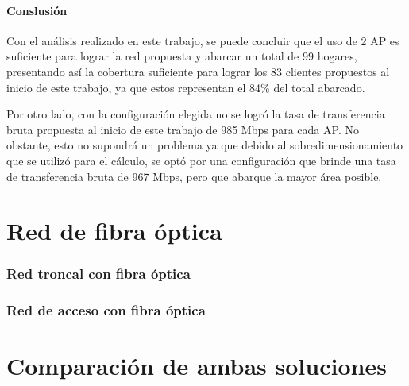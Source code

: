 \documentclass[11pt,a4paper]{article}
\begin{document}
\clearpage
\subsection{Conslusión}

Con el análisis realizado en este trabajo, se puede concluir que el uso de 2 AP es suficiente para lograr la red propuesta y abarcar un total de 99 hogares, presentando así la cobertura suficiente para lograr los 83 clientes propuestos al inicio de este trabajo, ya que estos representan el 84\% del total abarcado. 

Por otro lado, con la configuración elegida no se logró la tasa de transferencia bruta propuesta al inicio de este trabajo de 985 Mbps para cada AP. No obstante, esto no supondrá un problema ya que debido al sobredimensionamiento que se utilizó para el cálculo, se optó por una configuración que brinde una tasa de transferencia bruta de 967 Mbps, pero que abarque la mayor área posible.


\clearpage
\part{Red de fibra óptica}

\section{Red troncal con fibra óptica}







\section{Red de acceso con fibra óptica}


\part{Comparación de ambas soluciones}
\end{document}
